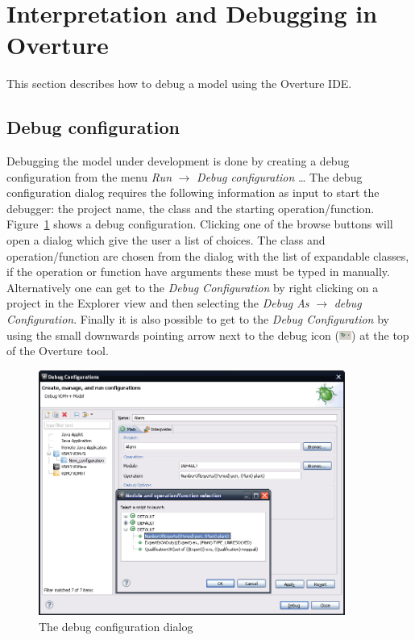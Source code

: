 \documentclass{overturerepsec}
\begin{document}
\section{Interpretation and Debugging in Overture}\label{sec:debug}

This section describes how to debug a model using the Overture IDE. 

\subsection{Debug configuration}

Debugging the model under development is done by creating a debug configuration
from the menu \emph{Run} $\rightarrow $ \emph{Debug configuration}
\ldots 
The debug
configuration dialog requires the following information as input to start the
debugger: the project name, the class and the starting operation/function.
Figure~\ref{fig:userguide:debugConfiguration} shows a debug configuration.
Clicking one of the browse buttons will open a dialog which give the user a list
of choices. The class and operation/function are chosen from the dialog with the
list of expandable classes, if the operation or function have arguments these
must be typed in manually. Alternatively one can get to the
\emph{Debug Configuration} by right clicking on a project in the
Explorer view and then selecting the \emph{Debug As} $\rightarrow$
\emph{debug Configuration}. Finally it is also possible to get to the
\emph{Debug Configuration} by using the small downwards pointing arrow
next to the debug icon
(\includegraphics[width=0.03\textwidth]{icons/debuggericon}) at the
top of the Overture tool. 

\begin{figure}[htp]
\begin{center}
  \includegraphics[width=380px]{figures/debugConfiguration}
  \caption{The debug configuration dialog}
  \label{fig:userguide:debugConfiguration}
\end{center}
\end{figure}
\end{document}
